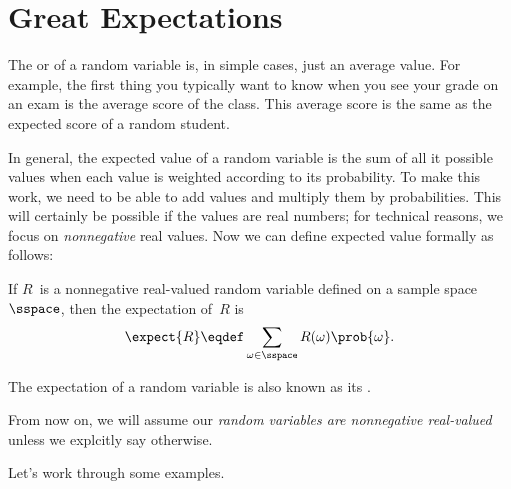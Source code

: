 \begin{problems}
\practiceproblems
{}

\classproblems
{}

\homeworkproblems
\end{problems}


\section{Great Expectations}\label{expectation_sec}

The  or  of a random variable
is, in simple cases, just an average value.  For example, the first
thing you typically want to know when you see your grade on an exam is
the average score of the class.  This average score is the same as the
expected score of a random student.

In general, the expected value of a random variable is the sum of all
it possible values when each value is weighted according to its
probability.  To make this work, we need to be able to add values and
multiply them by probabilities.  This will certainly be possible if
the values are real numbers; for technical reasons, we focus on
\emph{nonnegative} real values.  Now we can define expected value
formally as follows:
\begin{definition}\label{def:expectation}
If $R$~is a nonnegative real-valued random variable defined on a
sample space~$\sspace$, then the expectation of~$R$ is
\begin{equation}\label{eqn:expectation}
    \expect{R} \eqdef \sum_{\omega \in \sspace} R(\omega) \prob{\omega}.
\end{equation}
\end{definition}
The expectation of a random variable is also known as its .

From now on, we will assume our \emph{random variables are nonnegative
  real-valued} unless we explcitly say otherwise.

Let's work through some examples.

